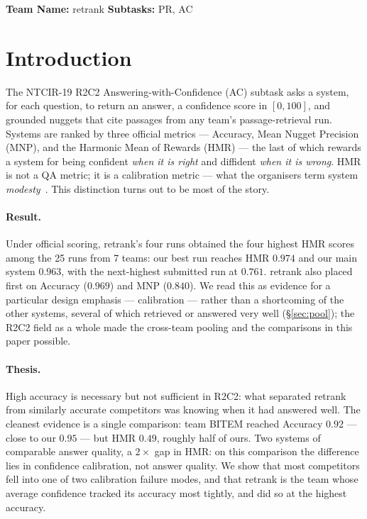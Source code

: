 \documentclass[sigconf,nonacm]{acmart}
\newcommand{\HMR}{\textsc{HMR}}
\newcommand{\MNP}{\textsc{MNP}}
\begin{document}

\maketitle

\noindent\textbf{Team Name:} retrank \quad\textbf{Subtasks:} PR, AC

\section{Introduction}
The NTCIR-19 R2C2 Answering-with-Confidence (AC) subtask asks a system, for each
question, to return an answer, a confidence score in $[0,100]$, and grounded nuggets that
cite passages from any team's passage-retrieval run. Systems are ranked by three official
metrics --- Accuracy, Mean Nugget Precision (\MNP), and the Harmonic Mean of Rewards
(\HMR) --- the last of which rewards a system for being confident \emph{when it is right}
and diffident \emph{when it is wrong}. \HMR{} is not a QA metric; it is a calibration
metric --- what the organisers term system \emph{modesty}~\cite{modesty,brevrag}. This
distinction turns out to be most of the story.

\paragraph{Result.} Under official scoring, retrank's four runs obtained the four highest
\HMR{} scores among the 25 runs from 7 teams: our best run reaches \HMR{} $0.974$ and our
main system $0.963$, with the next-highest submitted run at $0.761$. retrank also placed
first on Accuracy ($0.969$) and \MNP{} ($0.840$). We read this as evidence for a particular
design emphasis --- calibration --- rather than a shortcoming of the other systems, several
of which retrieved or answered very well (\S\ref{sec:pool}); the R2C2 field as a whole
made the cross-team pooling and the comparisons in this paper possible.

\paragraph{Thesis.} High accuracy is necessary but not sufficient in R2C2: what separated
retrank from similarly accurate competitors was knowing when it had answered well. The cleanest evidence is a single comparison: team BITEM reached
Accuracy $0.92$ --- close to our $0.95$ --- but \HMR{} $0.49$, roughly half of ours. Two
systems of comparable answer quality, a $2\times$ gap in \HMR: on this comparison the
difference lies in confidence calibration, not answer quality. We show that most competitors fell into one of two calibration
failure modes, and that retrank is the team whose average confidence tracked its
accuracy most tightly, and did so at the highest accuracy.
\end{document}

